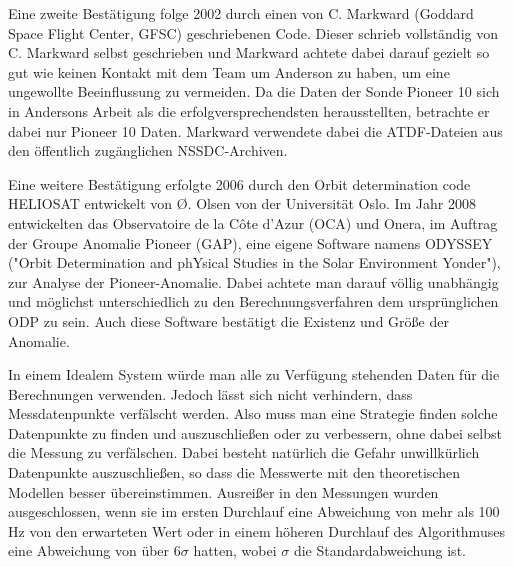 {Eine zweite Bestätigung folge 2002 durch einen von C. Markward (Goddard Space Flight Center, GFSC) geschriebenen
Code. Dieser schrieb vollständig von C. Markward selbst geschrieben und Markward achtete dabei darauf gezielt so gut wie keinen Kontakt mit dem Team um Anderson zu haben, um eine ungewollte Beeinflussung zu vermeiden.\cite{Markwardt2002} Da die Daten der Sonde Pioneer 10 sich in Andersons Arbeit als die erfolgversprechendsten herausstellten, betrachte er dabei nur Pioneer 10 Daten.\cite{Markwardt2002}
Markward verwendete dabei die ATDF-Dateien aus den öffentlich zugänglichen NSSDC-Archiven.

Eine weitere Bestätigung erfolgte 2006 durch den Orbit determination code HELIOSAT entwickelt von Ø. Olsen von der
Universität Oslo.
Im Jahr 2008 entwickelten das Observatoire de la Côte d’Azur (OCA) und Onera, im Auftrag der Groupe Anomalie Pioneer (GAP),
eine eigene Software namens ODYSSEY ("Orbit Determination and phYsical Studies in the Solar Environment Yonder"), zur Analyse der Pioneer-Anomalie.
Dabei achtete man darauf völlig unabhängig und möglichst unterschiedlich zu den Berechnungsverfahren dem ursprünglichen ODP zu sein. 
Auch diese Software bestätigt die Existenz und Größe der Anomalie.\cite{Levy2008}


In einem Idealem System würde man alle zu Verfügung stehenden Daten für die Berechnungen verwenden. Jedoch lässt sich nicht verhindern, dass Messdatenpunkte verfälscht werden. Also muss man eine Strategie finden solche Datenpunkte zu finden und auszuschließen oder zu verbessern, ohne dabei selbst die Messung zu verfälschen. Dabei besteht natürlich die Gefahr unwillkürlich Datenpunkte auszuschließen, so dass die Messwerte mit den theoretischen Modellen besser übereinstimmen.
Ausreißer in den Messungen wurden ausgeschlossen, wenn sie im ersten Durchlauf eine Abweichung von mehr als 100 Hz von den erwarteten Wert oder in einem höheren Durchlauf des Algorithmuses eine Abweichung von über $6\sigma$ hatten, wobei $\sigma$ die Standardabweichung ist.\cite{Levy2008} %
}